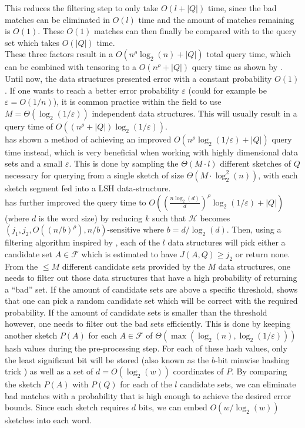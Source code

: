 This reduces the filtering step to only take $O(l + |Q|)$ time, since the bad matches can be eliminated in $O(l)$ time and the amount of matches remaining is $O(1)$. These $O(1)$ matches can then finally be compared with to the query set which takes $O(|Q|)$ time.\\
These three factors result in a $O(n^\rho \log_2(n) + |Q|)$ total query time, which can be combined with tensoring to a $O(n^\rho + |Q|)$ query time as shown by \citet{christiani2018fast}.\\
Until now, the data structures presented error with a constant probability $O(1)$. If one wants to reach a better error probability $\varepsilon$ (could for example be $\varepsilon = O(1/n)$), it is common practice within the field to use $M=\Theta(\log_2(1/\varepsilon))$ independent data structures. This will usually result in a query time of $O((n^\rho + |Q|)\log_2(1/\varepsilon))$. \\
\citet{fast-similarity-search} has shown a method of achieving an improved $O(n^\rho \log_2(1/\varepsilon)+|Q|)$ query time instead, which is very beneficial when working with highly dimensional data sets and a small $\varepsilon$. This is done by sampling the $\Theta(M\cdot l)$ different sketches of $Q$ necessary for querying from a single sketch of size $\Theta(M\cdot \log^2_2(n))$, with each sketch segment fed into a LSH data-structure. \\
\citet{fast-similarity-search} has further improved the query time to $O((\frac{n\log_2(d)}{d})^{\rho}\log_2(1/\varepsilon)+|Q|)$ (where $d$ is the word size) by reducing $k$ such that $\mathcal{H}$ becomes $(j_1, j_2, O((n/b)^\rho), n/b)$-sensitive where $b=d/\log_2(d)$. Then, using a filtering algorithm inspired by \cite{fast-similarity-search}, each of the $l$ data structures will pick either a candidate set $A\in \mathcal{F}$ which is estimated to have $J(A,Q) \geq j_2$ or return none. \\
From the $\leq M$ different candidate sets provided by the $M$ data structures, one needs to filter out those data structures that have a high probability of returning a ``bad'' set.
If the amount of candidate sets are above a specific threshold, \citet{fast-similarity-search} shows that one can pick a random candidate set which will be correct with the required probability. If the amount of candidate sets is smaller than the threshold however, one needs to filter out the bad sets efficiently. 
This is done by keeping another sketch $P(A)$ for each $A\in \mathcal{F}$ of $\Theta(\max(\log_2(n), \log_2(1/\varepsilon)))$ hash values during the pre-processing step. For each of these hash values, only the least significant bit will be stored (also known as the $b$-bit minwise hashing trick \cite{li2011hashing}) as well as a set of $d=O(\log_2(w))$ coordinates of $P$. By comparing the sketch $P(A)$ with $P(Q)$ for each of the $l$ candidate sets, we can eliminate bad matches with a probability that is high enough to achieve the desired error bounds. Since each sketch requires $d$ bits, we can embed $O(w/\log_2(w))$ sketches into each word.
